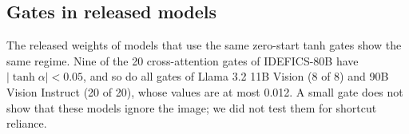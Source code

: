 \subsection{Gates in released models}

The released weights of models that use the same zero-start tanh gates show the same regime. Nine of the 20
cross-attention gates of IDEFICS-80B have \(|\tanh\alpha| < 0.05\), and so do all gates of Llama 3.2 11B Vision (8 of 8)
and 90B Vision Instruct (20 of 20), whose values are at most 0.012. A small gate does not show that these models
ignore the image; we did not test them for shortcut reliance.
